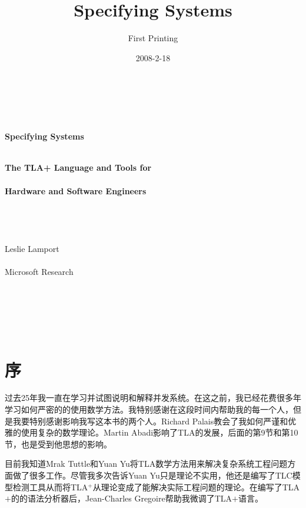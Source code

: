 \documentclass[utf8]{book}
\begin{document}
\title{\heiti Specifying Systems}
\author{First Printing}
\date{2008-2-18}

\frontmatter
\maketitle

\renewcommand\contentsname{目~录}
\tableofcontents

\chapter{\ }
\begin{center}
\huge{\textbf{Specifying Systems}}
\end{center}

\begin{center}
\quad \\ 
\textbf{The TLA+ Language and Tools for} \\
\quad \\ 
\textbf{Hardware and Software Engineers}\\
\quad \\ 
\quad \\ 
\quad \\ 
\quad \\ 
Leslie Lamport\\
\quad \\ 
Microsoft Research\\
\quad \\ 
\quad \\ 
\quad \\ 
\quad \\ 
\quad \\ 

\end{center}


\chapter{序}
过去25年我一直在学习并试图说明和解释并发系统。在这之前，我已经花费很多年学习如何严密的的使用数学方法。我特别感谢在这段时间内帮助我的每一个人，但是我要特别感谢影响我写这本书的两个人。Richard Palais教会了我如何严谨和优雅的使用复杂的数学理论。Martin Abadi影响了TLA的发展，后面的第9节和第10节，也是受到他思想的影响。

目前我知道Mrak Tuttle和Yuan Yu将TLA数学方法用来解决复杂系统工程问题方面做了很多工作。尽管我多次告诉Yuan Yu只是理论不实用，他还是编写了TLC模型检测工具从而将TLA$^+$从理论变成了能解决实际工程问题的理论。在编写了TLA$+$的的语法分析器后，Jean-Charles Gregoire帮助我微调了TLA$+$语言。
\end{document}
